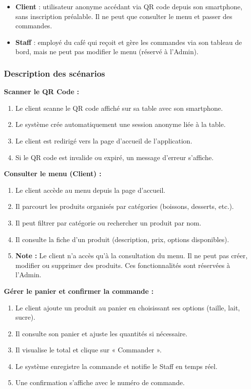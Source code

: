 \begin{itemize}
\item \textbf{Client} : utilisateur anonyme accédant via QR code depuis son smartphone, sans inscription préalable. Il ne peut que consulter le menu et passer des commandes.
\item \textbf{Staff} : employé du café qui reçoit et gère les commandes via son tableau de bord, mais ne peut pas modifier le menu (réservé à l'Admin).
\end{itemize}

\subsubsection{Description des scénarios}

\textbf{Scanner le QR Code :}
\begin{enumerate}
\item Le client scanne le QR code affiché sur sa table avec son smartphone.
\item Le système crée automatiquement une session anonyme liée à la table.
\item Le client est redirigé vers la page d'accueil de l'application.
\item Si le QR code est invalide ou expiré, un message d'erreur s'affiche.
\end{enumerate}

\textbf{Consulter le menu (Client) :}
\begin{enumerate}
\item Le client accède au menu depuis la page d'accueil.
\item Il parcourt les produits organisés par catégories (boissons, desserts, etc.).
\item Il peut filtrer par catégorie ou rechercher un produit par nom.
\item Il consulte la fiche d'un produit (description, prix, options disponibles).
\item \textbf{Note :} Le client n'a accès qu'à la consultation du menu. Il ne peut pas créer, modifier ou supprimer des produits. Ces fonctionnalités sont réservées à l'Admin.
\end{enumerate}

\textbf{Gérer le panier et confirmer la commande :}
\begin{enumerate}
\item Le client ajoute un produit au panier en choisissant ses options (taille, lait, sucre).
\item Il consulte son panier et ajuste les quantités si nécessaire.
\item Il visualise le total et clique sur « Commander ».
\item Le système enregistre la commande et notifie le Staff en temps réel.
\item Une confirmation s'affiche avec le numéro de commande.
\end{enumerate}

